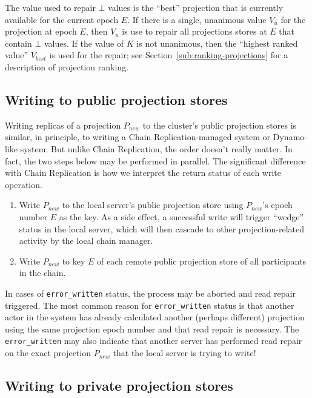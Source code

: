 \documentclass[preprint,10pt]{sigplanconf}
\begin{document}
The value used to repair $\bot$ values is the ``best'' projection that
is currently available for the current epoch $E$.  If there is a single,
unanimous value $V_{u}$ for the projection at epoch $E$, then $V_{u}$
is use to repair all projections stores at $E$ that contain $\bot$
values.  If the value of $K$ is not unanimous, then the ``highest
ranked value'' $V_{best}$ is used for the repair; see
Section~\ref{sub:ranking-projections} for a description of projection
ranking.

\subsection{Writing to public projection stores}
\label{sub:proj-store-writing}

Writing replicas of a projection $P_{new}$ to the cluster's public
projection stores is similar, in principle, to writing a Chain
Replication-managed system or Dynamo-like system.  But unlike Chain
Replication, the order doesn't really matter.
In fact, the two steps below may be performed in parallel.
The significant difference with Chain Replication is how we interpret
the return status of each write operation.

\begin{enumerate}
\item Write $P_{new}$ to the local server's public projection store
  using $P_{new}$'s epoch number $E$ as the key.
  As a side effect, a successful write will trigger
  ``wedge'' status in the local server, which will then cascade to other
  projection-related activity by the local chain manager.
\item Write $P_{new}$ to key $E$ of each remote public projection store of
  all participants in the chain.
\end{enumerate}

In cases of {\tt error\_written} status,
the process may be aborted and read repair
triggered.  The most common reason for {\tt error\_written} status
is that another actor in the system has
already calculated another (perhaps different) projection using the
same projection epoch number and that
read repair is necessary.  The {\tt error\_written} may also
indicate that another server has performed read repair on the exact
projection $P_{new}$ that the local server is trying to write!

\subsection{Writing to private projection stores}
\end{document}
